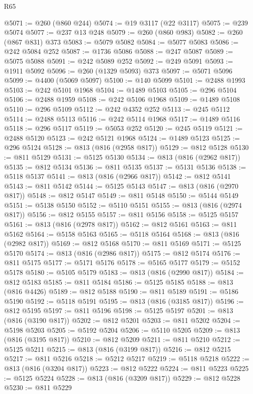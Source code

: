 \begin{lexlean}{R65}
\begin{coremodule}
{@5071 := @260 (@860 @244)
@5074 := @19 @3117 (@22 @3117)
@5075 := @239 @5074
@5077 := @237 @13 @248
@5079 := @260 (@860 @983)
@5082 := @260 (@867 @831) @373
@5083 := @5079 @5082
@5084 := @5077 @5083
@5086 := @242 @5084 @252
@5087 := @1736 @5086
@5088 := @247 @5087
@5089 := @5075 @5088
@5091 := @242 @5089 @252
@5092 := @249 @5091
@5093 := @1911 @5092
@5096 := @260 (@1329 @5093) @373
@5097 := @5071 @5096
@5099 := @4400 (@5069 @5097)
@5100 := @140 @5099
@5101 := @2488 @1993
@5103 := @242 @5101 @1968
@5104 := @1489 @5103
@5105 := @296 @5104
@5106 := @2488 @1959
@5108 := @242 @5106 @1968
@5109 := @1489 @5108
@5110 := @296 @5109
@5112 := @242 @4352 @252
@5113 := @245 @5112
@5114 := @2488 @5113
@5116 := @242 @5114 @1968
@5117 := @1489 @5116
@5118 := @296 @5117
@5119 := @5053 @252
@5120 := @245 @5119
@5121 := @2488 @5120
@5123 := @242 @5121 @1968
@5124 := @1489 @5123
@5125 := @296 @5124
@5128 := @813 (@816 (@2958 @817))
@5129 := @812 @5128
@5130 := @811 @5129
@5131 := @5125 @5130
@5134 := @813 (@816 (@2962 @817))
@5135 := @812 @5134
@5136 := @811 @5135
@5137 := @5131 @5136
@5138 := @5118 @5137
@5141 := @813 (@816 (@2966 @817))
@5142 := @812 @5141
@5143 := @811 @5142
@5144 := @5125 @5143
@5147 := @813 (@816 (@2970 @817))
@5148 := @812 @5147
@5149 := @811 @5148
@5150 := @5144 @5149
@5151 := @5138 @5150
@5152 := @5110 @5151
@5155 := @813 (@816 (@2974 @817))
@5156 := @812 @5155
@5157 := @811 @5156
@5158 := @5125 @5157
@5161 := @813 (@816 (@2978 @817))
@5162 := @812 @5161
@5163 := @811 @5162
@5164 := @5158 @5163
@5165 := @5118 @5164
@5168 := @813 (@816 (@2982 @817))
@5169 := @812 @5168
@5170 := @811 @5169
@5171 := @5125 @5170
@5174 := @813 (@816 (@2986 @817))
@5175 := @812 @5174
@5176 := @811 @5175
@5177 := @5171 @5176
@5178 := @5165 @5177
@5179 := @5152 @5178
@5180 := @5105 @5179
@5183 := @813 (@816 (@2990 @817))
@5184 := @812 @5183
@5185 := @811 @5184
@5186 := @5125 @5185
@5188 := @813 (@816 @4426)
@5189 := @812 @5188
@5190 := @811 @5189
@5191 := @5186 @5190
@5192 := @5118 @5191
@5195 := @813 (@816 (@3185 @817))
@5196 := @812 @5195
@5197 := @811 @5196
@5198 := @5125 @5197
@5201 := @813 (@816 (@3190 @817))
@5202 := @812 @5201
@5203 := @811 @5202
@5204 := @5198 @5203
@5205 := @5192 @5204
@5206 := @5110 @5205
@5209 := @813 (@816 (@3195 @817))
@5210 := @812 @5209
@5211 := @811 @5210
@5212 := @5125 @5211
@5215 := @813 (@816 (@3199 @817))
@5216 := @812 @5215
@5217 := @811 @5216
@5218 := @5212 @5217
@5219 := @5118 @5218
@5222 := @813 (@816 (@3204 @817))
@5223 := @812 @5222
@5224 := @811 @5223
@5225 := @5125 @5224
@5228 := @813 (@816 (@3209 @817))
@5229 := @812 @5228
@5230 := @811 @5229
}
\end{coremodule}
\end{lexlean}

